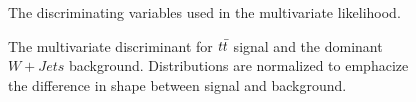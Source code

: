 \begin{figure}
\begin{center}
{    }
  \end{center}
  \caption{The discriminating variables used in the multivariate likelihood.}
  \label{img:DiscriminatingVariables}
\end{figure}


\begin{figure}
  \begin{center}

  \end{center}
  \caption{The multivariate discriminant for $t\bar{t}$ signal and the dominant $W+Jets$ background.  Distributions are normalized to emphacize the difference in shape between signal and background.}
  \label{img:LJetsLikelihoodDiscriminant}
\end{figure}


